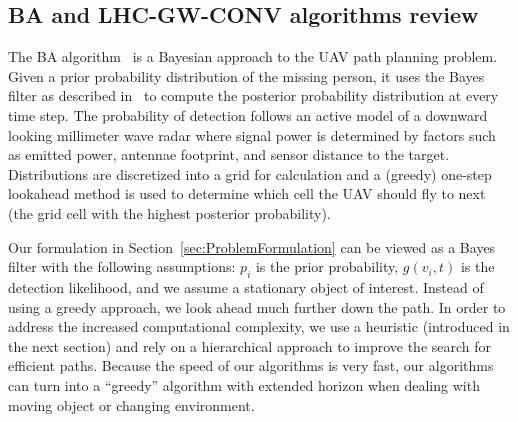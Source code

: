 \documentclass[journal]{IEEEtran}
\begin{document}
\subsection{BA and LHC-GW-CONV algorithms review}
\label{BALHCReview}


The BA algorithm~\cite{Bourgault2006} is a Bayesian approach to the UAV path planning problem. Given a prior probability distribution of the missing person, it uses the Bayes filter as described in~\cite{thrun2005probabilistic} to compute the posterior probability distribution at every time step. 
The probability of detection follows an active model of a downward looking millimeter wave radar where signal power is determined by factors such as emitted power, antennae footprint, and sensor distance to the target. Distributions are discretized into a grid for calculation and a (greedy) one-step lookahead method is used to determine which cell the UAV should fly to next (the grid cell with the highest posterior probability). 

Our formulation in Section~\ref{sec:ProblemFormulation} can be viewed as a Bayes filter with the following assumptions: $p_i$ is the prior probability, $g(v_i,t)$ is the detection likelihood, and we assume a stationary object of interest. Instead of using a greedy approach, we look ahead much further down the path. In order to address the increased computational complexity, we use a heuristic (introduced in the next section) and rely on a hierarchical approach to improve the search for efficient paths. Because the speed of our algorithms is very fast, our algorithms can turn into a ``greedy'' algorithm with extended horizon when dealing with moving object or changing environment.
\end{document}

